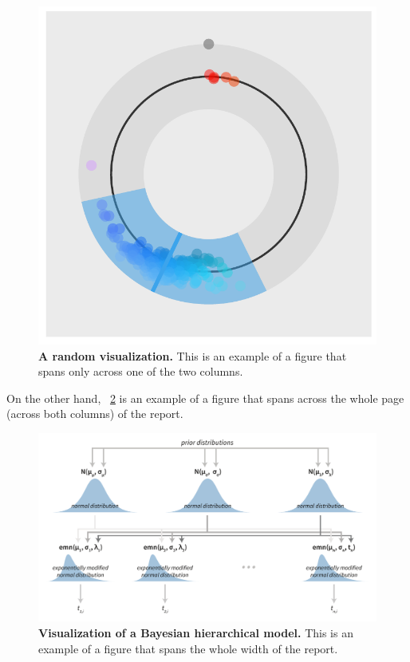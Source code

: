 \documentclass[fleqn,moreauthors,10pt]{ds_report}
\begin{document}
\begin{figure}[ht]\centering
	\includegraphics[width=\linewidth]{single_column.pdf}
	\caption{\textbf{A random visualization.} This is an example of a figure that spans only across one of the two columns.}
	\label{fig:column}
\end{figure}

On the other hand, \figurename~\ref{fig:whole} is an example of a figure that spans across the whole page (across both columns) of the report.

\begin{figure}[ht]\centering 
	\includegraphics[width=\linewidth]{whole_page.pdf}
	\caption{\textbf{Visualization of a Bayesian hierarchical model.} This is an example of a figure that spans the whole width of the report.}
	\label{fig:whole}
\end{figure}
\end{document}
